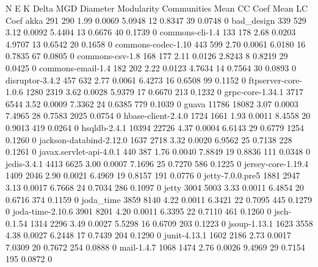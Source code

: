 \documentclass[12pt, a4paper]{article}
\begin{document}
N     E     K    Delta  MGD    Diameter Modularity Communities Mean CC Coef Mean LC Coef
akka                            291   290 1.99 0.0069 5.0948 12       0.8347       39        0.0748    0  
bad_design                      339   529 3.12 0.0092 5.4404 13       0.6676       40        0.1739    0  
commons-cli-1.4                 133   178 2.68 0.0203 4.9707 13       0.6542       20        0.1658    0  
commons-codec-1.10              443   599 2.70 0.0061 6.0180 16       0.7835       67        0.0805    0  
commons-csv-1.8                 168   177 2.11 0.0126 2.8243  8       0.8219       29        0.0425    0  
commons-email-1.4               182   202 2.22 0.0123 4.7634 14       0.7564       30        0.0893    0  
disruptor-3.4.2                 457   632 2.77 0.0061 6.4273 16       0.6508       99        0.1152    0  
ftpserver-core-1.0.6           1280  2319 3.62 0.0028 5.9379 17       0.6670      213        0.1232    0  
grpc-core-1.34.1               3717  6544 3.52 0.0009 7.3362 24       0.6385      779        0.1039    0  
guava                         11786 18082 3.07 0.0003 7.4965 28       0.7583     2025        0.0754    0  
hbase-client-2.4.0             1724  1661 1.93 0.0011 8.4558 20       0.9013      419        0.0264    0  
hsqldb-2.4.1                  10394 22726 4.37 0.0004 6.6143 29       0.6779     1254        0.1260    0  
jackson-databind-2.12.0        1637  2718 3.32 0.0020 6.9562 25       0.7138      228        0.1261    0  
javax.servlet-api-4.0.1         440   387 1.76 0.0040 7.8849 19       0.8836      111        0.0348    0  
jedis-3.4.1                    4413  6625 3.00 0.0007 7.1696 25       0.7270      586        0.1225    0  
jersey-core-1.19.4             1409  2046 2.90 0.0021 6.4969 19       0.8157      191        0.0776    0  
jetty-7.0.0.pre5               1881  2947 3.13 0.0017 6.7668 24       0.7034      286        0.1097    0  
jetty                          3004  5003 3.33 0.0011 6.4854 20       0.6716      374        0.1159    0  
joda_time                      3859  8140 4.22 0.0011 6.3421 22       0.7095      445        0.1279    0  
joda-time-2.10.6               3901  8201 4.20 0.0011 6.3395 22       0.7110      461        0.1260    0  
jsch-0.1.54                    1314  2296 3.49 0.0027 5.5298 16       0.6709      203        0.1223    0  
jsoup-1.13.1                   1623  3558 4.38 0.0027 6.2448 17       0.7439      204        0.1290    0  
junit-4.13.1                   1602  2186 2.73 0.0017 7.0309 20       0.7672      254        0.0888    0  
mail-1.4.7                     1068  1474 2.76 0.0026 9.4969 29       0.7154      195        0.0872    0  
\end{document}
